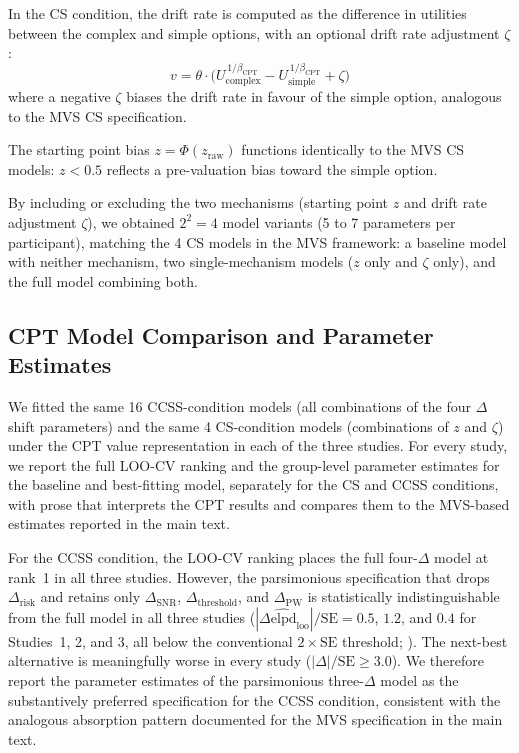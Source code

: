 \documentclass[man,floatsintext]{apa7}
\begin{document}
In the CS condition, the drift rate is computed as the difference in utilities between the complex and simple options, with an optional drift rate adjustment $\zeta$:
\begin{equation}
    v = \theta \cdot \bigl(U_{\text{complex}}^{\,1/\beta_{\text{CPT}}} - U_{\text{simple}}^{\,1/\beta_{\text{CPT}}} + \zeta\bigr)
    \label{eq:cpt_cs_drift}
\end{equation}
where a negative $\zeta$ biases the drift rate in favour of the simple option, analogous to the MVS CS specification.

The starting point bias $z = \Phi(z_{\text{raw}})$ functions identically to the MVS CS models: $z < 0.5$ reflects a pre-valuation bias toward the simple option.

By including or excluding the two mechanisms (starting point $z$ and drift rate adjustment $\zeta$), we obtained $2^2 = 4$ model variants (5 to 7 parameters per participant), matching the 4 CS models in the MVS framework: a baseline model with neither mechanism, two single-mechanism models ($z$ only and $\zeta$ only), and the full model combining both.

\subsection{CPT Model Comparison and Parameter Estimates}

We fitted the same 16 CCSS-condition models (all combinations of the four $\Delta$ shift parameters) and the same 4 CS-condition models (combinations of $z$ and $\zeta$) under the CPT value representation in each of the three studies. For every study, we report the full LOO-CV ranking and the group-level parameter estimates for the baseline and best-fitting model, separately for the CS and CCSS conditions, with prose that interprets the CPT results and compares them to the MVS-based estimates reported in the main text.

For the CCSS condition, the LOO-CV ranking places the full four-$\Delta$ model at rank~1 in all three studies. However, the parsimonious specification that drops $\Delta_{\text{risk}}$ and retains only $\Delta_{\text{SNR}}$, $\Delta_{\text{threshold}}$, and $\Delta_{\text{PW}}$ is statistically indistinguishable from the full model in all three studies ($|\Delta\widehat{\mathrm{elpd}}_{\mathrm{loo}}|/\mathrm{SE} = 0.5$, $1.2$, and $0.4$ for Studies~1, 2, and 3, all below the conventional $2 \times \mathrm{SE}$ threshold; \citealp{vehtari_practical_2017}). The next-best alternative is meaningfully worse in every study ($|\Delta|/\mathrm{SE} \geq 3.0$). We therefore report the parameter estimates of the parsimonious three-$\Delta$ model as the substantively preferred specification for the CCSS condition, consistent with the analogous absorption pattern documented for the MVS specification in the main text.
\end{document}
